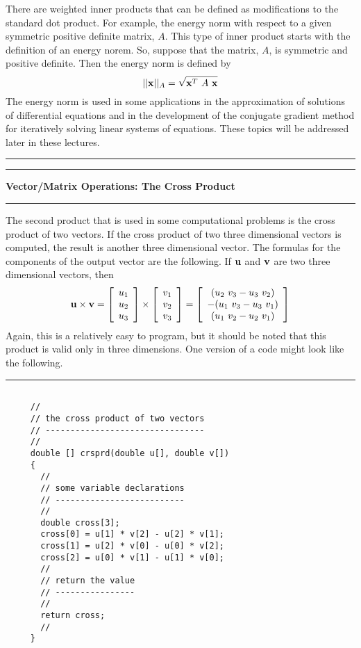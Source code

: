 \documentclass[10pt,fleqn]{article}
\begin{document}
There are weighted inner products that can be defined as modifications to the
standard dot product. For example, the energy norm with respect to a given
symmetric positive definite matrix, $A$. This type of inner product starts with
the definition of an energy norem. So, suppose that the matrix, $A$, is 
symmetric and positive definite. Then the energy norm is defined by
$$
  || {\bf x} ||_A = \sqrt{ {\bf x}^T\ A\ {\bf x} }
$$
The energy norm is used in some applications in the approximation of solutions
of differential equations and in the development of the conjugate gradient
method for iteratively solving linear systems of equations. These topics will be
addressed later in these lectures.
\vskip0.1in\hrule\vskip0.1in
\newpage
\vskip0.1in\hrule\vskip0.1in
\noindent
{\bf Vector/Matrix Operations: The Cross Product}
\vskip0.1in\hrule\vskip0.1in
\noindent
The second product that is used in some computational problems is the cross
product of two vectors. If the cross product of two three dimensional vectors
is computed, the result is another three dimensional vector. The formulas for
the components of the output vector are the following. If ${\bf u}$ and
${\bf v}$ are two three dimensional vectors, then
$$
  {\bf u} \times {\bf v} = 
       \left[
         \begin{array}{c}
           u_1 \\
           u_2 \\
           u_3
         \end{array}
       \right]
  \times \left[
         \begin{array}{c}
           v_1 \\
           v_2 \\
           v_3
         \end{array}
       \right]
     = \left[
         \begin{array}{c}
           ( u_2\ v_3  - u_3\ v_2 ) \\
         - ( u_1\ v_3  - u_3\ v_1 ) \\
           ( u_1\ v_2  - u_2\ v_1 ) 
         \end{array}
       \right]
$$
Again, this is a relatively easy to program, but it should be noted that this
product is valid only in three dimensions. One version of a code might look
like the following. 
\vskip0.1in\hrule\vskip0.1in
\begin{verbatim}

     //
     // the cross product of two vectors
     // --------------------------------
     //
     double [] crsprd(double u[], double v[])
     {
       //
       // some variable declarations
       // --------------------------
       //
       double cross[3];
       cross[0] = u[1] * v[2] - u[2] * v[1];
       cross[1] = u[2] * v[0] - u[0] * v[2];
       cross[2] = u[0] * v[1] - u[1] * v[0];
       //
       // return the value
       // ----------------
       //
       return cross;
       //
     }

\end{verbatim}
\end{document}
